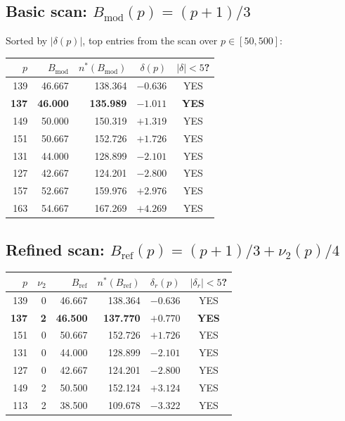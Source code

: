 \documentclass[12pt,a4paper]{article}
\theoremstyle{definition}
\theoremstyle{remark}
\begin{document}
\subsection{Basic scan: $B_{\mathrm{mod}}(p) = (p+1)/3$}

Sorted by $|\delta(p)|$, top entries from the scan over $p \in [50, 500]$:

\begin{center}
\begin{tabular}{rrrrc}
  \toprule
  $p$ & $B_{\mathrm{mod}}$ & $n^*(B_{\mathrm{mod}})$ & $\delta(p)$ & $|\delta|<5$? \\
  \midrule
  139 & 46.667 & 138.364 & $-0.636$ & YES \\
  \textbf{137} & \textbf{46.000} & \textbf{135.989} & $-1.011$ & \textbf{YES} \\
  149 & 50.000 & 150.319 & $+1.319$ & YES \\
  151 & 50.667 & 152.726 & $+1.726$ & YES \\
  131 & 44.000 & 128.899 & $-2.101$ & YES \\
  127 & 42.667 & 124.201 & $-2.800$ & YES \\
  157 & 52.667 & 159.976 & $+2.976$ & YES \\
  163 & 54.667 & 167.269 & $+4.269$ & YES \\
  \bottomrule
\end{tabular}
\end{center}

\subsection{Refined scan: $B_{\mathrm{ref}}(p) = (p+1)/3 + \nu_2(p)/4$}

\begin{center}
\begin{tabular}{rrrrrc}
  \toprule
  $p$ & $\nu_2$ & $B_{\mathrm{ref}}$ & $n^*(B_{\mathrm{ref}})$ & $\delta_r(p)$ & $|\delta_r|<5$? \\
  \midrule
  139 & 0 & 46.667 & 138.364 & $-0.636$ & YES \\
  \textbf{137} & \textbf{2} & \textbf{46.500} & \textbf{137.770} & $+0.770$ & \textbf{YES} \\
  151 & 0 & 50.667 & 152.726 & $+1.726$ & YES \\
  131 & 0 & 44.000 & 128.899 & $-2.101$ & YES \\
  127 & 0 & 42.667 & 124.201 & $-2.800$ & YES \\
  149 & 2 & 50.500 & 152.124 & $+3.124$ & YES \\
  113 & 2 & 38.500 & 109.678 & $-3.322$ & YES \\
  \bottomrule
\end{tabular}
\end{center}
\end{document}
